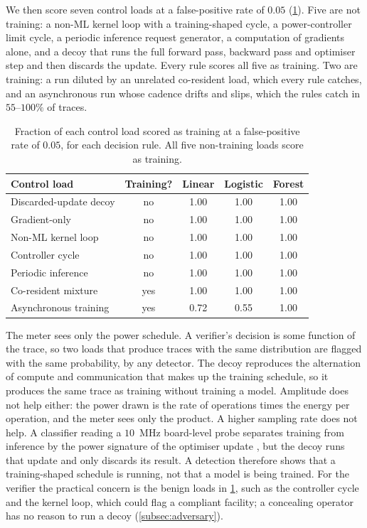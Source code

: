 \documentclass{article}
\begin{document}
We then score seven control loads at a false-positive rate
of $0.05$ (\cref{tab:rung2_controls}). Five are not training: a non-ML kernel
loop with a training-shaped cycle, a power-controller limit cycle, a periodic
inference request generator, a computation of gradients alone, and a decoy that
runs the full forward pass, backward pass and optimiser step and then discards
the update. Every rule scores all five as training. Two are training: a run
diluted by an unrelated co-resident load, which every rule catches, and an
asynchronous run whose cadence drifts and slips, which the rules catch in
$55$--$100\%$ of traces.

\begin{table}[h!]
	\centering
	\small
	\caption{Fraction of each control load scored as training at a
	false-positive rate of $0.05$, for each decision rule. All five non-training
	loads score as training.}
	\label{tab:rung2_controls}
	\begin{tabular}{@{}lcccc@{}}
		\toprule
		Control load & Training? & Linear & Logistic & Forest \\
		\midrule
		Discarded-update decoy & no & 1.00 & 1.00 & 1.00 \\
		Gradient-only & no & 1.00 & 1.00 & 1.00 \\
		Non-ML kernel loop & no & 1.00 & 1.00 & 1.00 \\
		Controller cycle & no & 1.00 & 1.00 & 1.00 \\
		Periodic inference & no & 1.00 & 1.00 & 1.00 \\
		Co-resident mixture & yes & 1.00 & 1.00 & 1.00 \\
		Asynchronous training & yes & 0.72 & 0.55 & 1.00 \\
		\bottomrule
	\end{tabular}
\end{table}

The meter sees only the power
schedule. A verifier's decision is some function of the trace, so two loads that
produce traces with the same distribution are flagged with the same
probability, by any detector. The decoy reproduces the alternation of compute
and communication that makes up the training schedule, so it produces the same
trace as training without training a model. Amplitude does not help either: the
power drawn is the rate of operations times the energy per operation, and the
meter sees only the product. A higher sampling rate does not help. A classifier
reading a $10$~MHz board-level probe separates training from inference by the
power signature of the optimiser update \citep{gargiulo2026workload}, but the
decoy runs that update and only discards its result. A detection therefore
shows that a training-shaped schedule is running, not that a model is being
trained. For the verifier the practical concern is the benign loads in
\cref{tab:rung2_controls}, such as the controller cycle and the kernel loop,
which could flag a compliant facility; a concealing operator has no reason to
run a decoy (\cref{subsec:adversary}).
\end{document}
